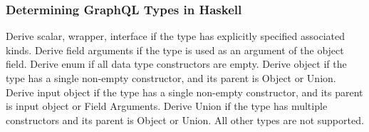 \begin{frame}[noframenumbering]\frametitle{Determining GraphQL Types in Haskell}
\begin{enumerate}
   Derive scalar, wrapper, interface if the type has explicitly specified associated kinds. 
   Derive field arguments if the type is used as an argument of the object field. 
   Derive enum if all data type constructors are empty.
   Derive object if the type has a single non-empty constructor, and its parent is Object or Union. 
   Derive input object if the type has a single non-empty constructor, and its parent is input object or Field Arguments.
   Derive Union if the type has multiple constructors and its parent is Object or Union.
   All other types are not supported.
\end{enumerate}
\end{frame}
